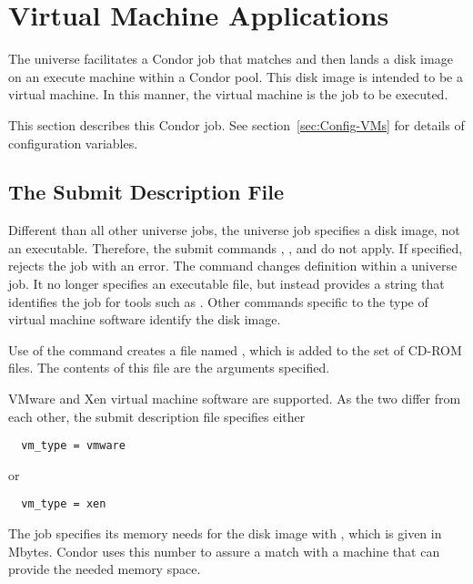 \section{\label{sec:vmuniverse}Virtual Machine Applications}

The  universe facilitates a Condor job
that matches and then lands a disk image on an execute machine
within a Condor pool.
This disk image is intended to be a virtual machine.
In this manner, the virtual machine is the job to be executed.

This section describes this Condor job.
See section~\ref{sec:Config-VMs}
for details of configuration variables.

\subsection{\label{sec:vm-submitfile}The Submit Description File}

Different than all other universe jobs,
the  universe job specifies a disk image,
not an executable.
Therefore, the submit commands , ,
and  do not apply.
If specified,  rejects the job with an error.
The  command changes definition within a
 universe job.
It no longer specifies an executable file, but instead
provides a string that identifies the job for tools such
as .
Other commands specific to the type of virtual machine software
identify the disk image.

Use of the  command creates a file named ,
which is added to the set of CD-ROM files.
The contents of this file are the arguments specified.

VMware and Xen virtual machine software are supported.
As the two differ from each other, the submit description file
specifies either
\begin{verbatim}
  vm_type = vmware
\end{verbatim}
or
\begin{verbatim}
  vm_type = xen
\end{verbatim}

The job specifies its memory needs 
for the disk image with ,
which is given in Mbytes.
Condor uses this number to assure a match with a machine
that can provide the needed memory space.

